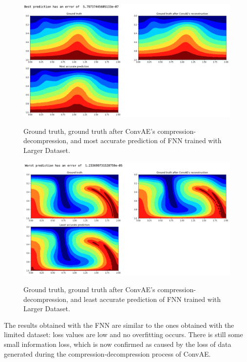 \begin{figure}[H]
    \caption{Ground truth, ground truth after ConvAE's compression-decompression, and most accurate prediction of FNN trained with Larger Dataset.}
    \includegraphics[scale=0.5]{figures/mantle_convection_images/larger_dataset/FNN_Best.png}
    \label{figure:FNN_larger_best}
\end{figure}

\begin{figure}[H]
    \caption{Ground truth, ground truth after ConvAE's compression-decompression, and least accurate prediction of FNN trained with Larger Dataset.}
    \includegraphics[scale=0.5]{figures/mantle_convection_images/larger_dataset/FNN_Worst.png}
    \label{figure:FNN_larger_worst}
\end{figure}

The results obtained with the FNN are similar to the ones obtained with the limited dataset: loss values are low and no overfitting occurs. There is still some small information loss, which is now confirmed as caused by the loss of data generated during the compression-decompression process of ConvAE.

